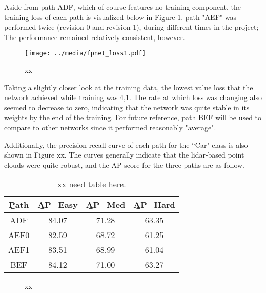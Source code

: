 Aside from path ADF, which of course features no training component, the training loss of each path is visualized below in Figure \ref{fpnet_loss1}. path "AEF" was performed twice (revision 0 and revision 1), during different times in the project; The performance remained relatively consistent, however.

\begin{figure}[H]
	\centering
	\texttt{[image: ../media/fpnet\_loss1.pdf]}
	\caption{xx}
	\label{fpnet_loss1}
\end{figure}

Taking a slightly closer look at the training data, the lowest value loss that the network achieved while training was 4,1. The rate at which loss was changing also seemed to decrease to zero, indicating that the network was quite stable in its weights by the end of the training. For future reference, path BEF will be used to compare to other networks since it performed reasonably "average".

Additionally, the precision-recall curve of each path for the ``Car" class is also shown in Figure xx. The curves generally indicate that the lidar-based point clouds were quite robust, and the AP score for the three paths are as follow.

\begin{table}[ht]
	\centering
	\caption{xx need table here.}
	\begin{tabular}{|c|c|c|c|}
		\hline
		\b{Path} & \b{AP\_Easy} & \b{AP\_Med} & \b{AP\_Hard} \\ \hline
		  ADF    &    84.07     &    71.28    &    63.35     \\ \hline
		  AEF0   &    82.59     &    68.72    &    61.25     \\ \hline
		  AEF1   &    83.51     &    68.99    &    61.04     \\ \hline
		  BEF    &    84.12     &    71.00    &    63.27     \\ \hline
	\end{tabular}
	\label{fpnet_ap1}
\end{table}


\begin{figure}[H]
	\centering
	\caption{xx}
	\label{fpnet_pr1}
\end{figure}




